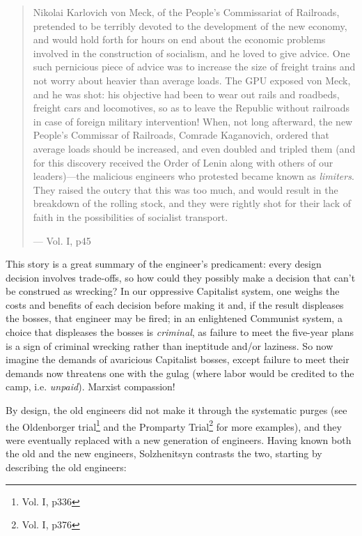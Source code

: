 \documentclass{article}
\begin{document}
\begin{quote}
Nikolai Karlovich von Meck, of the People's Commissariat of Railroads, pretended to be terribly devoted to the development of the new economy, and would hold forth for hours on end about the economic problems involved in the construction of socialism, and he loved to give advice.  One such pernicious piece of advice was to increase the size of freight trains and not worry about heavier than average loads.  The GPU exposed von Meck, and he was shot: his objective had been to wear out rails and roadbeds, freight cars and locomotives, so as to leave the Republic without railroads in case of foreign military intervention!  When, not long afterward, the new People's Commissar of Railroads, Comrade Kaganovich, ordered that average loads should be increased, and even doubled and tripled them (and for this discovery received the Order of Lenin along with others of our leaders)---the malicious engineers who protested became known as \emph{limiters}.  They raised the outcry that this was too much, and would result in the breakdown of the rolling stock, and they were rightly shot for their lack of faith in the possibilities of socialist transport.

--- Vol. I, p45
\end{quote}

This story is a great summary of the engineer's predicament: every design decision involves trade-offs, so how could they possibly make a decision that can't be construed as wrecking?  In our oppressive Capitalist system, one weighs the costs and benefits of each decision before making it and, if the result displeases the bosses, that engineer may be fired; in an enlightened Communist system, a choice that displeases the bosses is \emph{criminal}, as failure to meet the five-year plans is a sign of criminal wrecking rather than ineptitude and/or laziness.  So now imagine the demands of avaricious Capitalist bosses, except failure to meet their demands now threatens one with the gulag (where labor would be credited to the camp, i.e. \emph{unpaid}).  Marxist compassion!

By design, the old engineers did not make it through the systematic purges (see the Oldenborger trial\footnote{Vol. I, p336} and the Promparty Trial\footnote{Vol. I, p376} for more examples), and they were eventually replaced with a new generation of engineers.  Having known both the old and the new engineers, Solzhenitsyn contrasts the two, starting by describing the old engineers:
\end{document}
